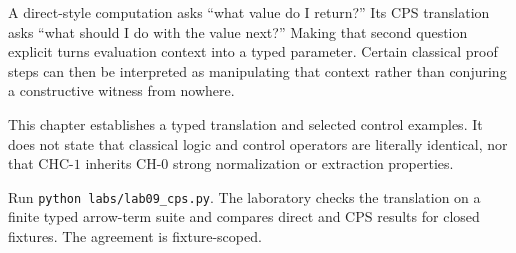 

\begin{workedexample}[title={The continuation is part of the term}]
A direct-style computation asks “what value do I return?” Its CPS translation asks “what should I do with the value next?” Making that second question explicit turns evaluation context into a typed parameter. Certain classical proof steps can then be interpreted as manipulating that context rather than conjuring a constructive witness from nowhere.
\end{workedexample}



\begin{warningbox}
This chapter establishes a typed translation and selected control examples. It does not state that classical logic and control operators are literally identical, nor that $\mathrm{CHC}\text{-}1$ inherits $\mathrm{CH}\text{-}0$ strong normalization or extraction properties.
\end{warningbox}

\begin{labbox}
Run \texttt{python labs/lab09_cps.py}. The laboratory checks the translation on a finite typed arrow-term suite and compares direct and CPS results for closed fixtures. The agreement is fixture-scoped.
\end{labbox}

